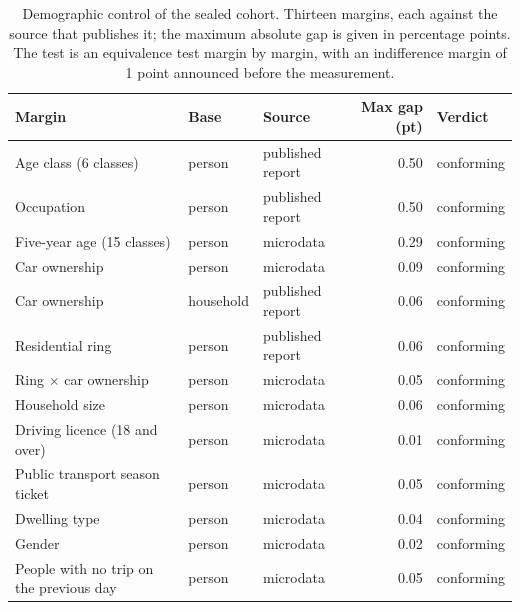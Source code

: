 \begin{table}[tp]
  \caption{Demographic control of the sealed cohort. Thirteen margins, each against the source that publishes it; the maximum absolute gap is given in percentage points. The test is an equivalence test margin by margin, with an indifference margin of 1 point announced before the measurement.}
  \label{tab:margins}
  \begin{tabular}{lllrl}
    \toprule
    Margin & Base & Source & Max gap (pt) & Verdict \\
    \midrule
    Age class (6 classes)                    & person    & published report & 0.50 & conforming \\
    Occupation                               & person    & published report & 0.50 & conforming \\
    Five-year age (15 classes)               & person    & microdata        & 0.29 & conforming \\
    Car ownership                            & person    & microdata        & 0.09 & conforming \\
    Car ownership                            & household & published report & 0.06 & conforming \\
    Residential ring                         & person    & published report & 0.06 & conforming \\
    Ring $\times$ car ownership              & person    & microdata        & 0.05 & conforming \\
    Household size                           & person    & microdata        & 0.06 & conforming \\
    Driving licence (18 and over)            & person    & microdata        & 0.01 & conforming \\
    Public transport season ticket           & person    & microdata        & 0.05 & conforming \\
    Dwelling type                            & person    & microdata        & 0.04 & conforming \\
    Gender                                   & person    & microdata        & 0.02 & conforming \\
    People with no trip on the previous day  & person    & microdata        & 0.05 & conforming \\
    \bottomrule
  \end{tabular}
\end{table}


